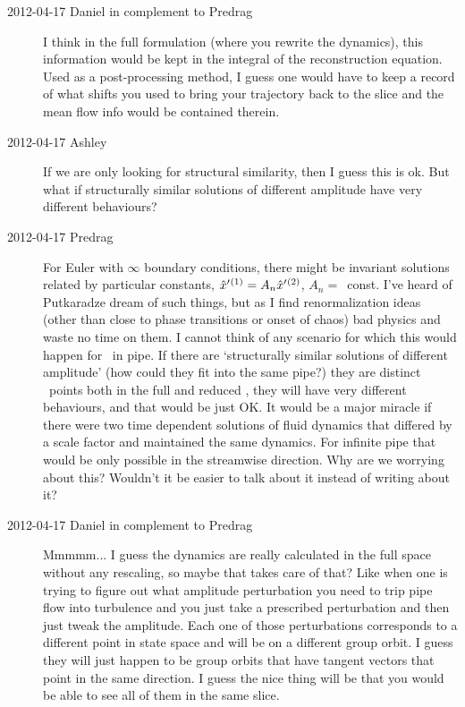 \begin{description}
\item[2012-04-17 Daniel in complement to Predrag] I think in the full
formulation (where you rewrite the dynamics), this information would be
kept in the integral of the reconstruction equation. Used as a
post-processing method, I guess one would have to keep a record of what
shifts you used to bring your trajectory back to the slice and the mean
flow info would be contained therein.

\item[2012-04-17 Ashley]
If we are only looking for structural similarity, then I guess this is
ok.  But what if structurally similar solutions of different amplitude
have very different behaviours?

\item[2012-04-17 Predrag] For Euler with $\infty$ boundary conditions,
there might be invariant solutions related by particular constants,
${\hat{x}'}{}^{(1)} = A_n {\hat{x}'}{}^{(2)}  $, $A_n=$~const. I've heard of
Putkaradze dream of such things, but as I find renormalization ideas
(other than close to phase transitions or onset of chaos) bad physics and
waste no time on them. I cannot think of any scenario for which this
would happen for \NSe\ in pipe. If there are `structurally similar
solutions of different amplitude' (how could they fit into the same
pipe?) they are distinct \statesp\ points both in the full and reduced
\statesp, they will have very different behaviours, and that would be
just OK. It would be a major miracle if there were two time dependent
solutions of fluid dynamics that differed by a scale factor and
maintained the same dynamics. For infinite pipe that would be only
possible in the streamwise direction. Why are we worrying about this?
Wouldn't it be easier to talk about it instead of writing about it?

\item[2012-04-17 Daniel in complement to Predrag] Mmmmm... I guess the
dynamics are really calculated in the full space without any rescaling,
so maybe that takes care of that? Like when one is trying to figure out
what amplitude perturbation you need to trip pipe flow into turbulence
and you just take a prescribed perturbation and then just tweak the
amplitude. Each one of those perturbations corresponds to a different
point in state space and will be on a different group orbit. I guess they
will just happen to be group orbits that have tangent vectors that point
in the same direction. I guess the nice thing will be that you would be
able to see all of them in the same slice.


\end{description}

